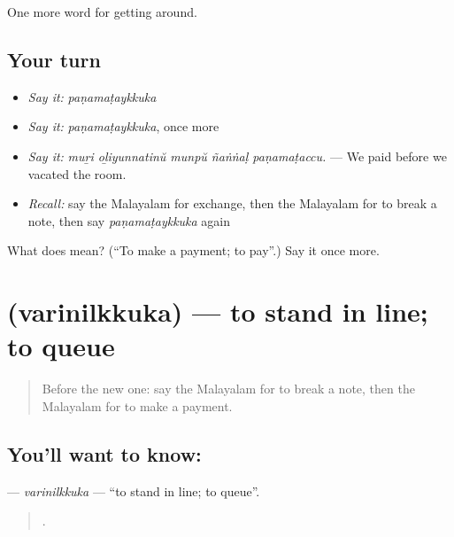\begin{grammarlens}[title={What you've built}]
One more word for getting around.
\end{grammarlens}

\subsection*{Your turn}
\begin{itemize}
\raggedright
  \item \emph{Say it:} \emph{paṇamaṭaykkuka}
  \item \emph{Say it:} \emph{paṇamaṭaykkuka}, once more
  \item \emph{Say it:} \emph{muṟi oḻiyunnatinŭ munpŭ ñaṅṅaḷ paṇamaṭaccu.} — We paid before we vacated the room.
  \item \emph{Recall:} say the Malayalam for exchange, then the Malayalam for to break a note, then say \emph{paṇamaṭaykkuka} again
\end{itemize}

\begin{tcolorbox}[breakable,colback=teal!4,colframe=teal!35!black,title={Before you move on}]
What does  mean? (\textquotedblleft{}To make a payment; to pay\textquotedblright{}.) Say it once more.
\end{tcolorbox}
\section[\texorpdfstring{\ml{വരിനിൽക്കുക} (varinilkkuka)}{വരിനിൽക്കുക (varinilkkuka)}]{ (varinilkkuka) — to stand in line; to queue}

\label{lesson:ML-C489-varinilkkuka}



\begin{quote}
Before the new one: say the Malayalam for to break a note, then the Malayalam for to make a payment.
\end{quote}

\subsection*{You'll want to know: }
\textbf{} — \emph{varinilkkuka} — \textquotedblleft{}to stand in line; to queue\textquotedblright{}.

\begin{quote}
    .
\end{quote}


